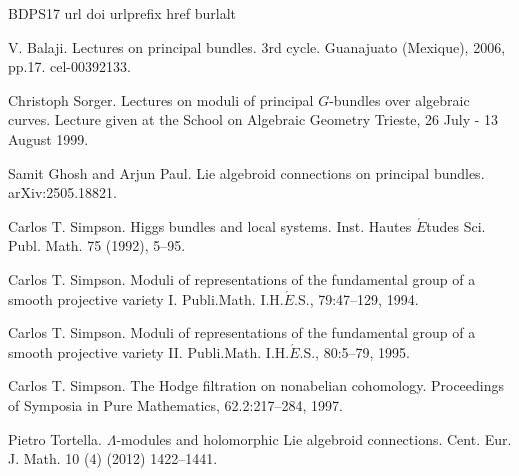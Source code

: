 \documentclass[12pt,reqno]{amsart}
\newcommand{\doi}[1]{\href{https://doi.org/#1}{doi:#1}}
\numberwithin{equation}{subsection}
\theoremstyle{definition}
\theoremstyle{theorem}
\begin{document}
\begin{thebibliography}{BDPS17}
	\expandafter\ifx\csname url\endcsname\relax
	\def\url#1{\texttt{#1}}\fi
	\expandafter\ifx\csname doi\endcsname\relax
	\def\doi#1{\burlalt{doi:#1}{http://doi.org/#1}}\fi
	\expandafter\ifx\csname urlprefix\endcsname\relax\def\urlprefix{URL }\fi
	\expandafter\ifx\csname href\endcsname\relax
	\def\href#1#2{#2}\fi
	\expandafter\ifx\csname burlalt\endcsname\relax
	\def\burlalt#1#2{\href{#2}{#1}}\fi
	
	V. Balaji.
	\newblock Lectures on principal bundles.
	\newblock  \href{https://cel.hal.science/cel-00392133/document}{3rd cycle. Guanajuato (Mexique), 2006, pp.17.
	cel-00392133}.
	
	Christoph Sorger.
	\newblock Lectures on moduli of principal
	$G$-bundles over algebraic curves.
	\newblock \href{https://www.math.sciences.univ-nantes.fr/~sorger/assets/pdf/trieste.pdf}{Lecture given at the School on Algebraic Geometry
	Trieste, 26 July - 13 August 1999}.
	
	 Samit Ghosh and Arjun Paul.
	\newblock Lie algebroid connections on principal bundles.
	\newblock 	\href{https://doi.org/10.48550/arXiv.2505.18821}{arXiv:2505.18821}.
	
	
	 Carlos T. Simpson.
	\newblock Higgs bundles and local systems.
	\newblock \href{https://www.scopus.com/pages/publications/51649132477}{Inst. Hautes $\acute{E}$tudes Sci. Publ. Math. 75 (1992), 5–95.}
	
	
	\newblock Carlos T. Simpson.
	\newblock Moduli of representations of the fundamental group of a smooth projective variety I.
	\newblock \href{https://www.scopus.com/pages/publications/51249163404}{Publi.Math. I.H.$\acute{E}$.S., 79:47–129, 1994.}
	
	\newblock Carlos T. Simpson.
	\newblock Moduli of representations of the fundamental group of a smooth projective variety II.
	\newblock \href{https://www.numdam.org/item/PMIHES_1994__80__5_0/}{Publi.Math. I.H.$\acute{E}$.S., 80:5–79, 1995.}
	
	\newblock Carlos T. Simpson.
	\newblock The Hodge filtration on nonabelian cohomology.
	\newblock \href{https://arxiv.org/pdf/alg-geom/9604005}{Proceedings of Symposia in Pure Mathematics, 62.2:217–284, 1997.}
	
	\newblock Pietro Tortella.
	\newblock $\Lambda$-modules and holomorphic Lie algebroid connections.
	\newblock  \href{https://link.springer.com/article/10.2478/s11533-012-0065-z}{Cent. Eur. J. Math. 10 (4) (2012) 1422–1441.}
	

\end{thebibliography}
\end{document}
